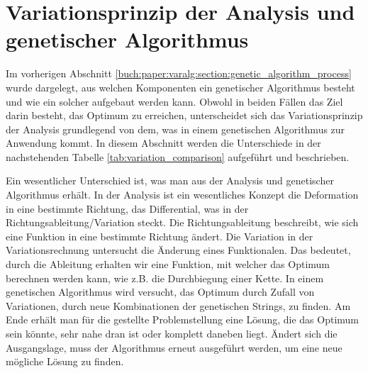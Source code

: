 %
%
%
%
\section{Variationsprinzip der Analysis und genetischer Algorithmus
  \label{buch:paper:varalg:section:variations_analysis_algorithm_result}}
Im vorherigen Abschnitt \ref{buch:paper:varalg:section:genetic_algorithm_process}
wurde dargelegt, aus welchen Komponenten ein genetischer Algorithmus besteht und wie 
ein solcher aufgebaut werden kann. 
Obwohl in beiden Fällen das Ziel darin besteht, das Optimum zu erreichen, unterscheidet
sich das Variationsprinzip der Analysis grundlegend von dem, was in einem genetischen 
Algorithmus zur Anwendung kommt. In diesem Abschnitt werden die Unterschiede in der 
nachstehenden Tabelle \ref{tab:variation_comparison} aufgeführt und 
beschrieben.

Ein wesentlicher Unterschied ist, was man aus der Analysis und genetischer Algorithmus 
erhält. In der Analysis ist ein wesentliches Konzept die Deformation in eine bestimmte 
Richtung, das Differential, was in der Richtungsableitung/Variation steckt. Die Richtungsableitung 
beschreibt, wie sich eine Funktion in eine bestimmte Richtung ändert. Die Variation in  
der Variationsrechnung untersucht die Änderung eines Funktionalen. Das bedeutet, durch die Ableitung 
erhalten wir eine Funktion, mit welcher das Optimum berechnen werden kann, wie z.B. die  
%
%
Durchbiegung einer Kette. In einem genetischen Algorithmus wird versucht, das Optimum durch Zufall von   
Variationen, durch neue Kombinationen der genetischen Strings, zu finden. Am 
Ende erhält man für die gestellte Problemstellung eine Lösung, die das Optimum sein könnte,  
sehr nahe dran ist oder komplett daneben liegt. Ändert sich die Ausgangslage, muss der Algorithmus 
erneut ausgeführt werden, um eine neue mögliche Lösung zu finden. 

